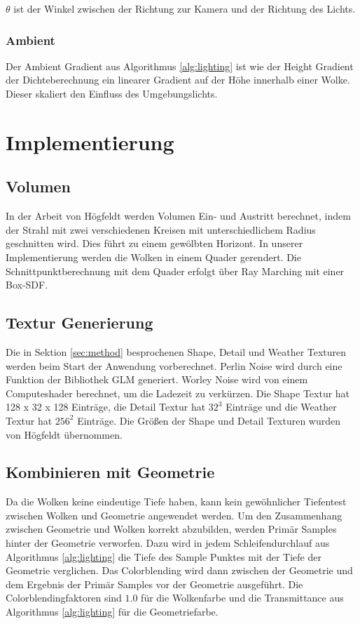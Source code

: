 $ \theta $ ist der Winkel zwischen der Richtung zur Kamera und der Richtung des Lichts.

\subsubsection{Ambient}
Der Ambient Gradient aus Algorithmus \ref{alg:lighting} ist wie der Height Gradient der Dichteberechnung ein linearer Gradient auf der Höhe innerhalb einer Wolke. Dieser skaliert den Einfluss des Umgebungslichts.

\section{Implementierung}
\label{sec:implement}

\subsection{Volumen}
In der Arbeit von Högfeldt \cite{Högfeldt16} werden Volumen Ein- und Austritt berechnet, indem der Strahl mit zwei verschiedenen Kreisen mit unterschiedlichem Radius geschnitten wird. Dies führt zu einem gewölbten Horizont. In unserer Implementierung werden die Wolken in einem Quader gerendert. Die Schnittpunktberechnung mit dem Quader erfolgt über Ray Marching mit einer Box-SDF.

\subsection{Textur Generierung}
Die in Sektion \ref{sec:method} besprochenen Shape, Detail und Weather Texturen werden beim Start der Anwendung vorberechnet. Perlin Noise wird durch eine Funktion der Bibliothek GLM generiert. Worley Noise wird von einem Computeshader berechnet, um die Ladezeit zu verkürzen. Die Shape Textur hat 128 x 32 x 128 Einträge, die Detail Textur hat $ 32^3 $ Einträge und die Weather Textur hat $ 256^2 $ Einträge. Die Größen der Shape und Detail Texturen wurden von Högfeldt \cite{Högfeldt16} übernommen.

\subsection{Kombinieren mit Geometrie}
Da die Wolken keine eindeutige Tiefe haben, kann kein gewöhnlicher Tiefentest zwischen Wolken und Geometrie angewendet werden. Um den Zusammenhang zwischen Geometrie und Wolken korrekt abzubilden, werden Primär Samples hinter der Geometrie verworfen. Dazu wird in jedem Schleifendurchlauf aus Algorithmus \ref{alg:lighting} die Tiefe des Sample Punktes mit der Tiefe der Geometrie verglichen. Das Colorblending wird dann zwischen der Geometrie und dem Ergebnis der Primär Samples vor der Geometrie ausgeführt. Die Colorblendingfaktoren sind $ 1.0 $ für die Wolkenfarbe und die Transmittance aus Algorithmus \ref{alg:lighting} für die Geometriefarbe.

